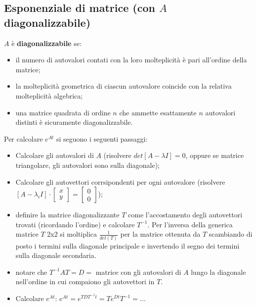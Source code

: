\begin{landscape}
\begin{multicols*}{3}
    \subsection{Esponenziale di matrice (con $A$ diagonalizzabile)}
    $A$ è \textbf{diagonalizzabile} se:
    \begin{itemize}
        \item il numero di autovalori contati con la loro molteplicità è pari all’ordine della matrice;
        \item la molteplicità geometrica di ciascun autovalore coincide con la relativa molteplicità algebrica;
        \item una matrice quadrata di ordine $n$ che ammette esattamente $n$ autovalori distinti è sicuramente diagonalizzabile.
    \end{itemize}
    Per calcolare $e^{At}$ si seguono i seguenti passaggi:
    \begin{itemize}
        \item Calcolare gli autovalori di $A$ (risolvere $det[A-\lambda I] = 0$, oppure se matrice triangolare, gli autovalori sono sulla diagonale);
        \item Calcolare gli autovettori corrsipondenti per ogni autovalore \newline (risolvere $[A-\lambda_i I] \cdot \left[\begin{matrix}
            x\\y
        \end{matrix}\right] = \left[\begin{matrix}
            0\\0
        \end{matrix}\right]$);
        \item definire la matrice diagonalizzante $T$ come l'accostamento degli autovettori trovati (ricordando l'ordine) e calcolare $T^{-1}$. Per l’inversa della generica matrice $T$ 2x2 si moltiplica $\frac{1}{det(T)}$ per la matrice ottenuta da $T$ scambiando di posto i termini sulla diagonale principale e invertendo
        il segno dei termini sulla diagonale secondaria.
        \item notare che $T^{-1} A T = D = $ matrice con gli autovalori di $A$ lungo la diagonale nell'ordine in cui compaiono gli autovettori in $T$.
        \item Calcolare $e^{At}$:\newline
        $e^{At} = e^{TDT^{-1} t} = T e^{Dt} T^{-1} = \dots$
    \end{itemize}

\end{multicols*}
\end{landscape}
